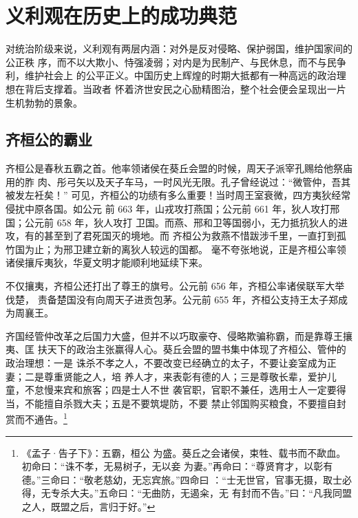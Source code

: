 \section{义利观在历史上的成功典范}

对统治阶级来说，义利观有两层内涵：对外是反对侵略、保护弱国，维护国家间的公正秩
序，而不以大欺小、恃强凌弱；对内是为民制产、与民休息，而不与民争利，维护社会上
的公平正义。中国历史上辉煌的时期大抵都有一种高远的政治理想在背后支撑着。当政者
怀着济世安民之心励精图治，整个社会便会呈现出一片生机勃勃的景象。

\subsection{齐桓公的霸业}

齐桓公是春秋五霸之首。他率领诸侯在葵丘会盟的时候，周天子派宰孔赐给他祭庙用的胙
肉、彤弓矢以及天子车马，一时风光无限。孔子曾经说过：“微管仲，吾其被发左衽矣！”
可见，齐桓公的功绩有多么重要！当时周王室衰微，四方夷狄经常侵扰中原各国。如公元
前 663 年，山戎攻打燕国；公元前 661 年，狄人攻打邢国；公元前 658 年，狄人攻打
卫国。而燕、邢和卫等国弱小，无力抵抗狄人的进攻，有的甚至到了君死国灭的境地。而
齐桓公为救燕不惜跋涉千里，一直打到孤竹国为止；为邢卫建立新的离狄人较远的国都。
毫不夸张地说，正是齐桓公率领诸侯攘斥夷狄，华夏文明才能顺利地延续下来。

不仅攘夷，齐桓公还打出了尊王的旗号。公元前 656 年，齐桓公率诸侯联军大举伐楚，
责备楚国没有向周天子进贡包茅。公元前 655 年，齐桓公支持王太子郑成为周襄王。

齐国经管仲改革之后国力大盛，但并不以巧取豪夺、侵略欺骗称霸，而是靠尊王攘夷、匡
扶天下的政治主张赢得人心。葵丘会盟的盟书集中体现了齐桓公、管仲的政治理想：一是
诛杀不孝之人，不要改变已经确立的太子，不要让妾室成为正妻；二是尊重贤能之人，培
养人才，来表彰有德的人；三是尊敬长辈，爱护儿童，不怠慢来宾和旅客；四是士人不世
袭官职，官职不兼任，选用士人一定要得当，不能擅自杀戮大夫；五是不要筑堤防，不要
禁止邻国购买粮食，不要擅自封赏而不通告。\footnote{《孟子·告子下》：五霸，桓公
    为盛。葵丘之会诸侯，束牲、载书而不歃血。初命曰：“诛不孝，无易树子，无以妾
    为妻。”再命曰：“尊贤育才，以彰有德。”三命曰：“敬老慈幼，无忘宾旅。”四命曰
    ：“士无世官，官事无摄，取士必得，无专杀大夫。”五命曰：“无曲防，无遏籴，无
    有封而不告。”曰：“凡我同盟之人，既盟之后，言归于好。”}

